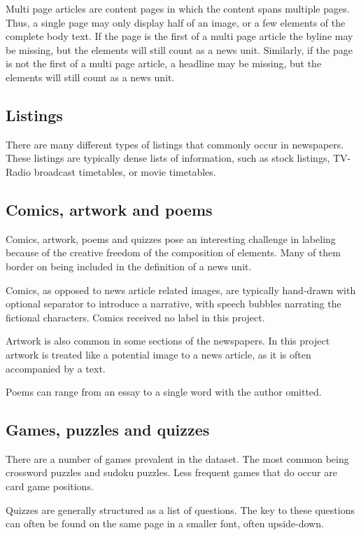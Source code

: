 \documentclass[english, bibtex]{kththesis}
\begin{document}
Multi page articles are content pages in which the content spans multiple pages. Thus, a single page may only display half of an image, or a few elements of the complete body text. If the page is the first of a multi page article the byline may be missing, but the elements will still count as a news unit. Similarly, if the page is not the first of a multi page article, a headline may be missing, but the elements will still count as a news unit.

\subsection{Listings}

There are many different types of listings that commonly occur in newspapers. These listings are typically dense lists of information, such as stock listings, TV-Radio broadcast timetables, or movie timetables.

\subsection{Comics, artwork and poems}

Comics, artwork, poems and quizzes pose an interesting challenge in labeling because of the creative freedom of the composition of elements. Many of them border on being included in the definition of a news unit.

Comics, as opposed to news article related images, are typically hand-drawn with optional separator to introduce a narrative, with speech bubbles narrating the fictional characters. Comics received no label in this project.

Artwork is also common in some sections of the newspapers. In this project artwork is treated like a potential image to a news article, as it is often accompanied by a text.

Poems can range from an essay to a single word with the author omitted.

\subsection{Games, puzzles and quizzes}

There are a number of games prevalent in the dataset. The most common being crossword puzzles and sudoku puzzles. Less frequent games that do occur are card game positions.

Quizzes are generally structured as a list of questions. The key to these questions can often be found on the same page in a smaller font, often upside-down.
\end{document}
